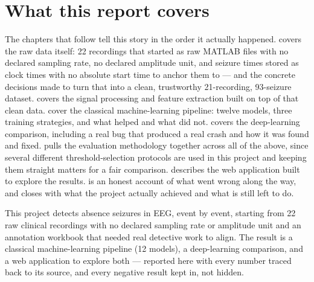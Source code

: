 \section{What this report covers}

The chapters that follow tell this story in the order it actually happened. 
covers the raw data itself: 22 recordings that started as raw MATLAB files with no declared
sampling rate, no declared amplitude unit, and seizure times stored as clock times with no
absolute start time to anchor them to --- and the concrete decisions made to turn that into a
clean, trustworthy 21-recording, 93-seizure dataset.  covers the signal
processing and feature extraction built on top of that clean data.
 cover the classical machine-learning
pipeline: twelve models, three training strategies, and what helped and what did not.
 covers the deep-learning comparison, including a real bug that produced
a real crash and how it was found and fixed.  pulls the evaluation
methodology together across all of the above, since several different threshold-selection
protocols are used in this project and keeping them straight matters for a fair comparison.
 describes the web application built to explore the results.
 is an honest account of what went wrong along the way, and
 closes with what the project actually achieved and what is still left to
do.

\begin{summarybox}
This project detects absence seizures in EEG, event by event, starting from 22 raw clinical
recordings with no declared sampling rate or amplitude unit and an annotation workbook that
needed real detective work to align. The result is a classical machine-learning pipeline (12
models), a deep-learning comparison, and a web application to explore both --- reported here
with every number traced back to its source, and every negative result kept in, not hidden.
\end{summarybox}
